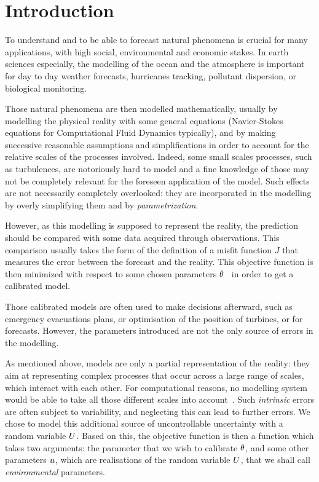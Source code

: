 \documentclass[../../Main_ManuscritThese.tex]{subfiles}
\begin{document}
\pagestyle{introStyle}
\chapter*{Introduction}
\TitleBtwLines

{}
\label{chap:Introduction}





To understand and to be able to forecast natural phenomena is crucial
for many applications, with high social, environmental and economic
stakes.  In earth sciences especially, the modelling of the ocean and
the atmosphere is important for day to day weather forecasts,
hurricanes tracking, pollutant dispersion, or biological monitoring.

Those natural phenomena are then modelled mathematically, usually by
modelling the physical reality with some general equations
(Navier-Stokes equations for Computational Fluid Dynamics typically),
and by making successive reasonable assumptions and simplifications in
order to account for the relative scales of the processes
involved. Indeed, some small scales processes, such as turbulences,
are notoriously hard to model and a fine knowledge of those may not be
completely relevant for the foreseen application of the model. Such
effects are not necessarily completely overlooked: they are
incorporated in the modelling by overly simplifying them and by
\emph{parametrization}.

However, as this modelling is supposed to represent the reality, the
prediction should be compared with some data acquired through
observations. This comparison usually takes the form of the definition
of a misfit function $J$ that measures the error between the forecast
and the reality. This objective function is then minimized with
respect to some chosen parameters
$\theta$~\cite{das_estimation_1991,das_variational_1992,boutet_estimation_2015}
in order to get a calibrated model.

Those calibrated models are often used to make decisions afterward,
such as emergency evacuations plans, or optimisation of the position
of turbines, or for forecasts. However, the parameters introduced are
not the only source of errors in the modelling.

As mentioned above, models are only a partial representation of the
reality: they aim at representing complex processes that occur across
a large range of scales, which interact with each other. For
computational reasons, no modelling system would be able to take all
those different scales into
account~\cite{mcwilliams_irreducible_2007}. Such \emph{intrinsic}
errors are often subject to variability, and neglecting this can lead
to further errors. We chose to model this additional source of
uncontrollable uncertainty with a random variable $U$.  Based on
this, the objective function is then a function which takes two
arguments: the parameter that we wish to calibrate $\theta$, and some
other parameters $u$, which are realisations of the random variable
$U$, that we shall call \emph{environmental} parameters.
\end{document}
